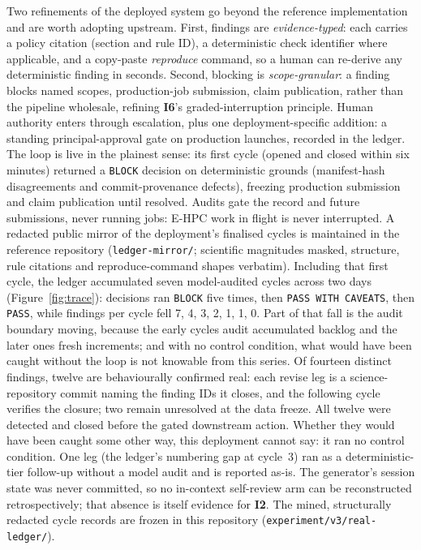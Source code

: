 \documentclass[11pt,letterpaper]{article}
\newcommand{\invariant}[1]{\textbf{I#1}}
\begin{document}
Two refinements of the deployed system go beyond the reference implementation and are worth adopting upstream. First, findings are \emph{evidence-typed}: each carries a policy citation (section and rule ID), a deterministic check identifier where applicable, and a copy-paste \emph{reproduce} command, so a human can re-derive any deterministic finding in seconds. Second, blocking is \emph{scope-granular}: a finding blocks named scopes, production-job submission, claim publication, rather than the pipeline wholesale, refining \invariant{6}'s graded-interruption principle. Human authority enters through escalation, plus one deployment-specific addition: a standing principal-approval gate on production launches, recorded in the ledger. The loop is live in the plainest sense: its first cycle (opened and closed within six minutes) returned a \texttt{BLOCK} decision on deterministic grounds (manifest-hash disagreements and commit-provenance defects), freezing production submission and claim publication until resolved. Audits gate the record and future submissions, never running jobs: E-HPC work in flight is never interrupted. A redacted public mirror of the deployment's finalised cycles is maintained in the reference repository (\texttt{ledger-mirror/}; scientific magnitudes masked, structure, rule citations and reproduce-command shapes verbatim). Including that first cycle, the ledger accumulated seven model-audited cycles across two days (Figure~\ref{fig:trace}): decisions ran \texttt{BLOCK} five times, then \texttt{PASS WITH CAVEATS}, then \texttt{PASS}, while findings per cycle fell 7, 4, 3, 2, 1, 1, 0. Part of that fall is the audit boundary moving, because the early cycles audit accumulated backlog and the later ones fresh increments; and with no control condition, what would have been caught without the loop is not knowable from this series. Of fourteen distinct findings, twelve are behaviourally confirmed real: each revise leg is a science-repository commit naming the finding IDs it closes, and the following cycle verifies the closure; two remain unresolved at the data freeze. All twelve were detected and closed before the gated downstream action. Whether they would have been caught some other way, this deployment cannot say: it ran no control condition. One leg (the ledger's numbering gap at cycle~3) ran as a deterministic-tier follow-up without a model audit and is reported as-is. The generator's session state was never committed, so no in-context self-review arm can be reconstructed retrospectively; that absence is itself evidence for \invariant{2}. The mined, structurally redacted cycle records are frozen in this repository (\texttt{experiment/v3/real-ledger/}).
\end{document}
